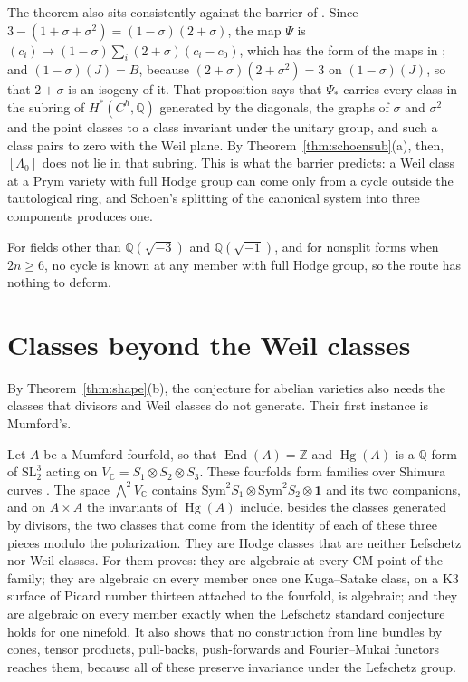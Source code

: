 \documentclass[11pt]{amsart}
\theoremstyle{definition}
\theoremstyle{remark}
\newcommand{\QQ}{\mathbb{Q}}
\newcommand{\ZZ}{\mathbb{Z}}
\newcommand{\CC}{\mathbb{C}}
\newcommand{\End}{\operatorname{End}}
\newcommand{\Hg}{\operatorname{Hg}}
\begin{document}
The theorem also sits consistently against the barrier of \cite{BhW}.
Since $3-(1+\sigma+\sigma^{2})=(1-\sigma)(2+\sigma)$, the map $\Psi$ is
$(c_{i})\mapsto(1-\sigma)\sum_{i}(2+\sigma)(c_{i}-c_{0})$, which has the form
of the maps in \cite[Proposition~11]{BhW}; and $(1-\sigma)(J)=B$, because
$(2+\sigma)(2+\sigma^{2})=3$ on $(1-\sigma)(J)$, so that $2+\sigma$ is an
isogeny of it. That proposition says that $\Psi_{*}$
carries every class in the subring of $H^{*}(C^{h},\QQ)$ generated by the
diagonals, the graphs of $\sigma$ and $\sigma^{2}$ and the point classes to a
class invariant under the unitary group, and such a class pairs to zero with
the Weil plane. By Theorem~\ref{thm:schoensub}(a), then, $[\Lambda_{0}]$ does
not lie in that subring. This is what the barrier predicts: a Weil class at
a Prym variety with full Hodge group can come only from a cycle outside the
tautological ring, and Schoen's splitting of the canonical system into three
components produces one.

For fields other than $\QQ(\sqrt{-3})$ and $\QQ(\sqrt{-1})$, and for
nonsplit forms when $2n\ge6$, no cycle is known at any member with full
Hodge group, so the route has nothing to deform.

\section{Classes beyond the Weil classes}\label{sec:beyondweil}

By Theorem~\ref{thm:shape}(b), the conjecture for abelian varieties also
needs the classes that divisors and Weil classes do not generate. Their
first instance is Mumford's.

Let $A$ be a Mumford fourfold, so that $\End(A)=\ZZ$ and $\Hg(A)$ is a
$\QQ$-form of $\mathrm{SL}_{2}^{3}$ acting on $V_{\CC}=S_{1}\otimes S_{2}\otimes
S_{3}$. These fourfolds form families over Shimura curves
\cite{Mum69}. The space $\bigwedge^{2}V_{\CC}$ contains
$\mathrm{Sym}^{2}S_{1}\otimes\mathrm{Sym}^{2}S_{2}\otimes\mathbf{1}$ and its two
companions, and on $A\times A$ the invariants of $\Hg(A)$ include, besides the
classes generated by divisors, the two classes that come from the identity of
each of these three pieces modulo the polarization. They are Hodge classes
that are neither Lefschetz nor Weil classes. For them \cite{BhH8} proves:
they are algebraic at every CM point of the family; they are algebraic on
every member once one Kuga--Satake class, on a K3 surface of Picard number
thirteen attached to the fourfold, is algebraic; and they are algebraic on
every member exactly when the Lefschetz standard conjecture holds for one
ninefold. It also shows that no construction from line bundles by cones,
tensor products, pull-backs, push-forwards and Fourier--Mukai functors
reaches them, because all of these preserve invariance under the Lefschetz
group.
\end{document}
